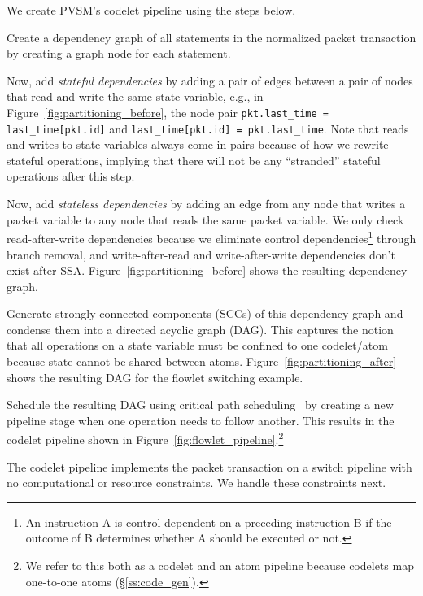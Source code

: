We create PVSM's codelet pipeline using the steps below.
\begin{CompactEnumerate}
  \item Create a dependency graph of all statements in the normalized packet
    transaction by creating a graph node for each statement.
  \item Now, add {\em stateful dependencies} by adding a pair of edges between
    a pair of nodes that read and write the same state variable, e.g., in
    Figure~\ref{fig:partitioning_before}, the node pair {\tt pkt.last\_time =
    last\_time[pkt.id]} and {\tt last\_time[pkt.id] = pkt.last\_time}. Note that
    reads and writes to state variables always come in pairs because of how we
    rewrite stateful operations, implying that there will not be any ``stranded''
    stateful operations after this step.
  \item Now, add {\em stateless dependencies} by adding an edge from any node
    that writes a packet variable to any node that reads the same packet
    variable.  We only check read-after-write dependencies because we
    eliminate control dependencies\footnote{An instruction A is control
    dependent on a preceding instruction B if the outcome of B determines
    whether A should be executed or not.} through branch removal, and
    write-after-read and write-after-write dependencies don't exist after SSA.
    Figure~\ref{fig:partitioning_before} shows the resulting dependency graph.
  \item Generate strongly connected components (SCCs) of this dependency graph
    and condense them into a directed acyclic graph (DAG). This captures the notion that all
    operations on a state variable must be confined to one codelet/atom because
    state cannot be shared between atoms. Figure~\ref{fig:partitioning_after}
    shows the resulting DAG for the flowlet switching example.
  \item Schedule the resulting DAG using critical path
    scheduling~\cite{crit_path_sched} by creating a new pipeline stage when one
    operation needs to follow another. This results in the codelet pipeline
    shown in Figure~\ref{fig:flowlet_pipeline}.\footnote{We refer to this both
    as a codelet and an atom pipeline because codelets map one-to-one atoms
  (\S\ref{ss:code_gen}).}
\end{CompactEnumerate}

The codelet pipeline implements the packet transaction on a switch pipeline
with no computational or resource constraints. We handle these constraints
next.

